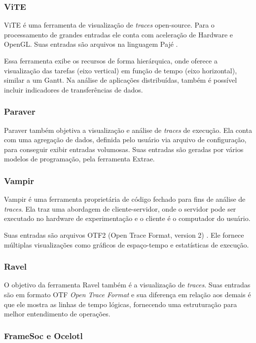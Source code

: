 \documentclass[prop-esp]{iiufrgs}
\begin{document}
\subsubsection*{ViTE}
ViTE \cite{ref:vite} é uma ferramenta de visualização de \emph{traces} open-source. Para o processamento de grandes entradas ele conta com aceleração de Hardware e OpenGL. Suas entradas são arquivos na linguagem Pajé \cite{ref:paje}.

Essa ferramenta exibe os recursos de forma hierárquica, onde oferece a visualização das tarefas (eixo vertical) em função de tempo (eixo horizontal), similar a um Gantt. Na análise de aplicações distribuídas, também é possível incluir indicadores de transferências de dados.

\subsubsection*{Paraver}
Paraver \cite{ref:paraver} também objetiva a visualização e análise de \emph{traces} de execução. Ela conta com uma agregação de dados, definida pelo
usuário via arquivo de configuração, para conseguir exibir entradas volumosas. Suas entradas são geradas por vários modelos de programação, pela ferramenta Extrae.

\subsubsection*{Vampir}
Vampir \cite{ref:vampir} é uma ferramenta proprietária de código fechado para fins de análise de \emph{traces}. Ela traz uma abordagem de cliente-servidor, onde o servidor pode ser executado no hardware de experimentação e o cliente é o computador do usuário.

Suas entradas são arquivos OTF2 (Open Trace Format, version 2) \cite{ref:otf2}. Ele fornece múltiplas visualizações como gráficos de espaço-tempo e estatísticas de execução.

\subsubsection*{Ravel}
O objetivo da ferramenta Ravel \cite{ref:ravel} também é a visualização de \emph{traces}. Suas entradas são em formato OTF \emph{Open Trace Format} e sua diferença em relação aos demais é que ele mostra as linhas de tempo lógicas, fornecendo uma estruturação para melhor entendimento de operações.

\subsubsection*{FrameSoc e Ocelotl}
\end{document}
